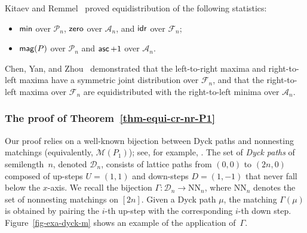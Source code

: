 \documentclass[11pt]{article}
\DeclareMathOperator{\magg}{\mbox{\sf{mag}}}
\DeclareMathOperator{\minn}{\mbox{\sf{min}}}
\DeclareMathOperator{\asc}{\mbox{\sf{asc}}}
\DeclareMathOperator{\idr}{\mbox{\sf{idr}}}
\DeclareMathOperator{\zero}{\mbox{\sf{zero}}}
\newcommand{\A}{\mathcal{A}}
\newcommand{\PP}{{\mathcal P}}
\newcommand{\F}{\mathcal{F}}
\newcommand{\M}{\mathcal{M}}
\begin{document}
	Kitaev and Remmel~\cite{Kitaev-Remmel} proved equidistribution of the following statistics:
	\begin{itemize}
		\item $\minn$ over $\PP_n$, $\zero$ over $\A_n$, and $\idr$ over $\F_n$;
		\item $\magg(P)$ over $\PP_n$ and $\asc+1$ over $\A_n$.
	\end{itemize}
	Chen, Yan, and Zhou~\cite{Chen-Yan-Zhou} demonstrated that the left-to-right maxima and right-to-left maxima have a symmetric joint distribution over $\F_n$, 
	and that the right-to-left maxima over $\F_n$ are equidistributed with the right-to-left minima over $\A_n$.
	
	\subsubsection{The proof of Theorem~\ref{thm-equi-cr-nr-P1}}\label{proof-thm-1-3}
	
	Our proof relies on a well-known bijection between Dyck paths and nonnesting matchings (equivalently, $\M(P_1)$); see, for example, \cite{Stanley}. The set of \emph{Dyck paths} of semilength~$ n $, denoted $ \mathcal{D}_n $, consists of lattice paths from $ (0, 0) $ to $ (2n, 0) $ composed of up-steps $ U = (1, 1) $ and down-steps $ D = (1, -1) $ that never fall below the $ x $-axis. We recall the bijection $ \Gamma \colon \mathcal{D}_n \to \mathrm{NN}_n $, where $ \mathrm{NN}_n $ denotes the set of nonnesting matchings on $ [2n] $. Given a Dyck path $ \mu $, the matching $ \Gamma(\mu) $ is obtained by pairing the $i$-th up-step with the corresponding $i$-th down step.
	Figure~\ref{fig-exa-dyck-m} shows an example of the application of~$\Gamma$.
	
\end{document}
